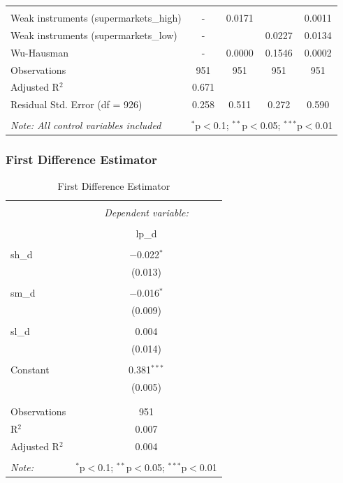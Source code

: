 \documentclass{article}
\begin{document}
\begin{table}[!htbp]
\begin{tabular}{@{\extracolsep{5pt}}lcccc}
\hline \\[-1.8ex] 
Weak instruments (supermarkets\_high) & - & 0.0171 &  & 0.0011  \\ 
Weak instruments (supermarkets\_low) & - &  & 0.0227 & 0.0134 \\ 
Wu-Hausman & - & 0.0000 & 0.1546 & 0.0002\\ 
Observations & 951 & 951 & 951 & 951 \\ 
Adjusted R$^{2}$ & 0.671 &  &  &  \\ 
Residual Std. Error (df = 926) & 0.258 & 0.511 & 0.272 & 0.590 \\ 
\hline 
\hline \\[-1.8ex] 
\textit{Note: All control variables included}  & \multicolumn{4}{r}{$^{*}$p$<$0.1; $^{**}$p$<$0.05; $^{***}$p$<$0.01} \\ 
\end{tabular} 
\end{table} 


\subsubsection{First Difference Estimator}
\begin{table}[H] \centering 
  \caption{First Difference Estimator} 
  \label{} 
\small 
\begin{tabular}{@{\extracolsep{-10pt}}lc} 
\\[-1.8ex]\hline 
\hline \\[-1.8ex] 
 & \multicolumn{1}{c}{\textit{Dependent variable:}} \\ 
\cline{2-2} 
\\[-1.8ex] & lp\_d \\ 
\hline \\[-1.8ex] 
 sh\_d & $-$0.022$^{*}$ \\ 
  & (0.013) \\ 
  & \\ 
 sm\_d & $-$0.016$^{*}$ \\ 
  & (0.009) \\ 
  & \\ 
 sl\_d & 0.004 \\ 
  & (0.014) \\ 
  & \\ 
 Constant & 0.381$^{***}$ \\ 
  & (0.005) \\ 
  & \\ 
\hline \\[-1.8ex] 
Observations & 951 \\ 
R$^{2}$ & 0.007 \\ 
Adjusted R$^{2}$ & 0.004 \\ 
\hline 
\hline \\[-1.8ex] 
\textit{Note:}  & \multicolumn{1}{r}{$^{*}$p$<$0.1; $^{**}$p$<$0.05; $^{***}$p$<$0.01} \\ 
\end{tabular} 
\end{table} 
\end{document}
